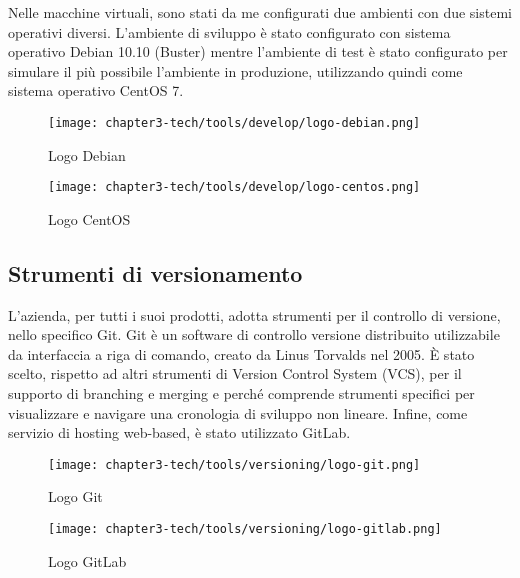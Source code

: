 \noindent
Nelle macchine virtuali, sono stati da me configurati due ambienti con due sistemi operativi diversi. L'ambiente di sviluppo è stato configurato con sistema operativo Debian 10.10 (Buster) mentre l'ambiente di test è stato configurato per simulare il più possibile l'ambiente in produzione, utilizzando quindi come sistema operativo CentOS 7.
\begin{figure}[!h]
    \begin{minipage}{.5\textwidth} 
        \centering 
        \texttt{[image: chapter3-tech/tools/develop/logo-debian.png]} 
        \caption{Logo Debian} 
        \label{fig:virtualbox} 
    \end{minipage}%
    \begin{minipage}{.5\textwidth} 
        \centering 
        \texttt{[image: chapter3-tech/tools/develop/logo-centos.png]} 
        \caption{Logo CentOS} 
        \label{fig:pycharm} 
    \end{minipage}  
\end{figure}
\subsection{Strumenti di versionamento}

L’azienda, per tutti i suoi prodotti, adotta strumenti per il controllo di versione, nello specifico Git. Git è un software di controllo versione distribuito utilizzabile da interfaccia a riga di comando, creato da Linus Torvalds nel 2005. È stato scelto, rispetto ad altri strumenti di Version Control System (VCS), per il supporto di branching e merging e perché comprende strumenti specifici per visualizzare e navigare una cronologia di sviluppo non lineare. Infine, come servizio di hosting web-based, è stato utilizzato GitLab.

\begin{figure}[!h]
    \begin{minipage}{.5\textwidth} 
        \centering 
        \texttt{[image: chapter3-tech/tools/versioning/logo-git.png]} 
        \caption{Logo Git} 
        \label{fig:git} 
    \end{minipage}%
    \begin{minipage}{.5\textwidth} 
        \centering 
        \texttt{[image: chapter3-tech/tools/versioning/logo-gitlab.png]} 
        \caption{Logo GitLab} 
        \label{fig:gitlab} 
    \end{minipage}  
\end{figure}

